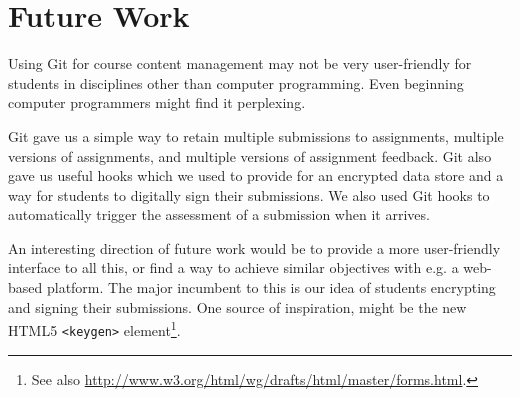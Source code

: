 
\section{Future Work}

Using Git for course content management may not be very user-friendly for
students in disciplines other than computer programming. Even beginning
computer programmers might find it perplexing.

Git gave us a simple way to retain multiple submissions to assignments,
multiple versions of assignments, and multiple versions of assignment feedback.
Git also gave us useful hooks which we used to provide for an encrypted data
store and a way for students to digitally sign their submissions. We also used
Git hooks to automatically trigger the assessment of a submission when it
arrives.

An interesting direction of future work would be to provide a more
user-friendly interface to all this, or find a way to achieve similar
objectives with e.g. a web-based platform. The major incumbent to this is our
idea of students encrypting and signing their submissions. One source of
inspiration, might be the new HTML5 \texttt{<keygen>} element\footnote{See also
\url{http://www.w3.org/html/wg/drafts/html/master/forms.html}.}.


